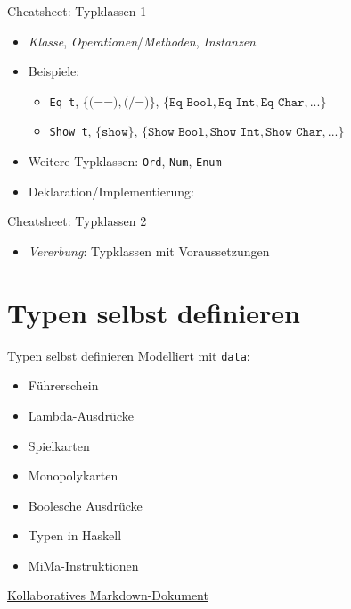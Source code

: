 \documentclass{beamer}
\begin{document}
\begin{frame}{Cheatsheet: Typklassen 1}
  \begin{itemize}
    \item \emph{Klasse}, \emph{Operationen}/\emph{Methoden}, \emph{Instanzen}
    \item Beispiele:
    \begin{itemize}
      \item \texttt{Eq t}, $\{ \texttt{(==)}, \texttt{(/=)} \}$, $\{ \texttt{Eq Bool}, \texttt{Eq Int}, \texttt{Eq Char}, ... \}$
      \item \texttt{Show t}, $\{ \texttt{show} \}$, $\{ \texttt{Show Bool}, \texttt{Show Int}, \texttt{Show Char}, ... \}$
    \end{itemize}
    \item Weitere Typklassen: \texttt{Ord}, \texttt{Num}, \texttt{Enum}
    \item Deklaration/Implementierung:
  \end{itemize}

\end{frame}

\begin{frame}{Cheatsheet: Typklassen 2}
  \begin{itemize}
    \item \emph{Vererbung}: Typklassen mit Voraussetzungen
  \end{itemize}

\end{frame}

\section{Typen selbst definieren}

\begin{frame}{Typen selbst definieren}
  Modelliert mit \texttt{data}:

  \vfill

  \begin{itemize}
    \item Führerschein
    \item Lambda-Ausdrücke
    \item Spielkarten
    \item Monopolykarten
    \item Boolesche Ausdrücke
    \item Typen in Haskell
    \item MiMa-Instruktionen
  \end{itemize}

  \vfill

  \href{https://codi.teuber.dev/8hJC3QsPR5SU7ACRZlXgGg\#}{Kollaboratives Markdown-Dokument}
\end{frame}
\end{document}
